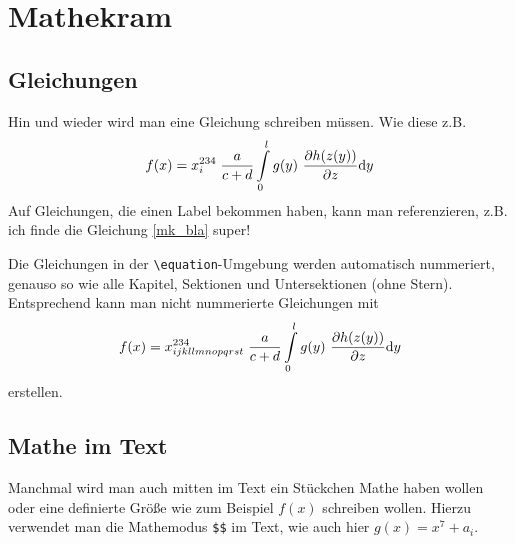 
\chapter{Mathekram}
\label{mk}


\section{Gleichungen}

Hin und wieder wird man eine Gleichung schreiben müssen. Wie diese z.B.
\begin{equation}
	f(x)
	= x_i^{234} \hspace{1mm} \frac{a}{c+d}
		\int_0^l\limits{
		g(y) \ \frac{\partial h(z(y))}{\partial z}
		}{\rm d} y
	\label{mk_bla}
\end{equation}
Auf Gleichungen, die einen Label bekommen haben, kann man referenzieren, z.B. ich finde die Gleichung \eqref{mk_bla} super!

Die Gleichungen in der \verb=\equation=-Umgebung werden automatisch nummeriert, genauso so wie alle Kapitel, Sektionen und Untersektionen (ohne Stern). Entsprechend kann man nicht nummerierte Gleichungen mit 
\begin{equation*}
	f(x)
	= x_{ijkllmnopqrst}^{234} \hspace{1mm} \frac{a}{c+d}
		\int_0^l\limits{
		g(y) \ \frac{\partial h(z(y))}{\partial z}
		}{\rm d} y
\end{equation*}
erstellen.


\section{Mathe im Text}

Manchmal wird man auch mitten im Text ein Stückchen Mathe haben wollen oder eine definierte Größe wie zum Beispiel $f(x)$ schreiben wollen. Hierzu verwendet man die Mathemodus \verb=$$= im Text, wie auch hier $g(x) = x^7 + a_i$.



